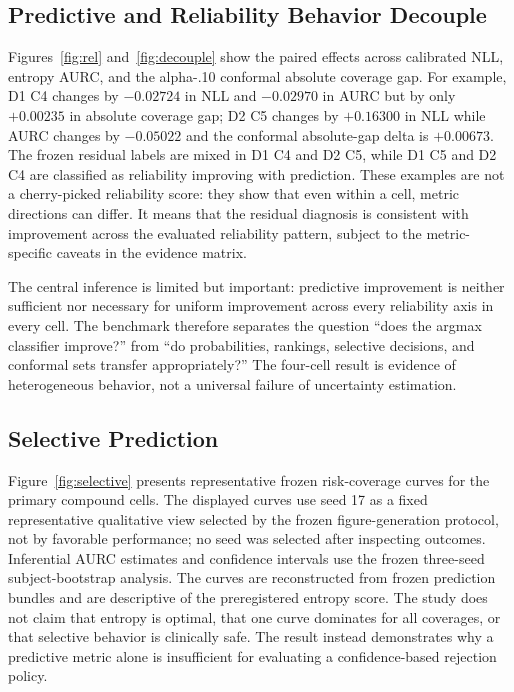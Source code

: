\documentclass[10pt,twocolumn]{article}
\begin{document}
\subsection{Predictive and Reliability Behavior Decouple}
Figures~\ref{fig:rel} and~\ref{fig:decouple} show the paired effects across calibrated NLL, entropy AURC, and the alpha-.10 conformal absolute coverage gap. For example, D1 C4 changes by $-0.02724$ in NLL and $-0.02970$ in AURC but by only $+0.00235$ in absolute coverage gap; D2 C5 changes by $+0.16300$ in NLL while AURC changes by $-0.05022$ and the conformal absolute-gap delta is $+0.00673$. The frozen residual labels are mixed in D1 C4 and D2 C5, while D1 C5 and D2 C4 are classified as reliability improving with prediction. These examples are not a cherry-picked reliability score: they show that even within a cell, metric directions can differ. It means that the residual diagnosis is consistent with improvement across the evaluated reliability pattern, subject to the metric-specific caveats in the evidence matrix.

The central inference is limited but important: predictive improvement is neither sufficient nor necessary for uniform improvement across every reliability axis in every cell. The benchmark therefore separates the question “does the argmax classifier improve?” from “do probabilities, rankings, selective decisions, and conformal sets transfer appropriately?” The four-cell result is evidence of heterogeneous behavior, not a universal failure of uncertainty estimation.

\subsection{Selective Prediction}
Figure~\ref{fig:selective} presents representative frozen risk-coverage curves for the primary compound cells. The displayed curves use seed 17 as a fixed representative qualitative view selected by the frozen figure-generation protocol, not by favorable performance; no seed was selected after inspecting outcomes. Inferential AURC estimates and confidence intervals use the frozen three-seed subject-bootstrap analysis. The curves are reconstructed from frozen prediction bundles and are descriptive of the preregistered entropy score. The study does not claim that entropy is optimal, that one curve dominates for all coverages, or that selective behavior is clinically safe. The result instead demonstrates why a predictive metric alone is insufficient for evaluating a confidence-based rejection policy.
\end{document}
